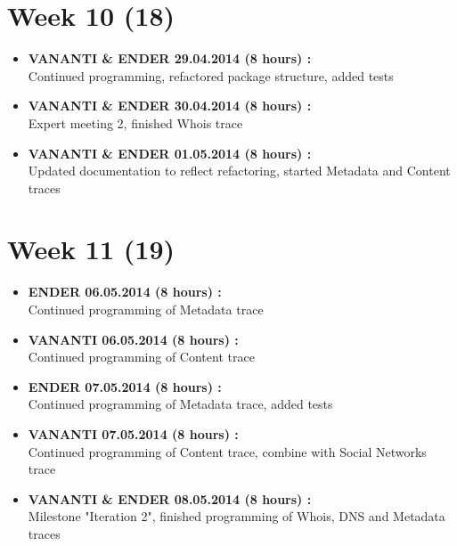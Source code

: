 \documentclass[
	a4paper,					10pt,							twoside,					openright,				notitlepage,			parskip=half,			]{scrreprt}
\begin{document}
\section*{Week 10 (18)}
\label{sec:worklog_10}
\begin{itemize}
\item{\textbf{VANANTI \& ENDER 29.04.2014 (8 hours) :} \\  Continued programming, refactored package structure, added tests}
\item{\textbf{VANANTI \& ENDER 30.04.2014 (8 hours) :} \\  Expert meeting 2, finished Whois trace}
\item{\textbf{VANANTI \& ENDER 01.05.2014 (8 hours) :} \\  Updated documentation to reflect refactoring, started Metadata and Content traces}
\end{itemize}
\section*{Week 11 (19)}
\label{sec:worklog_11}
\begin{itemize}
\item{\textbf{ENDER 06.05.2014 (8 hours) :} \\  Continued programming of Metadata trace}
\item{\textbf{VANANTI 06.05.2014 (8 hours) :} \\  Continued programming of Content trace}
\item{\textbf{ENDER 07.05.2014 (8 hours) :} \\  Continued programming of Metadata trace, added tests}
\item{\textbf{VANANTI 07.05.2014 (8 hours) :} \\  Continued programming of Content trace, combine with Social Networks trace}
\item{\textbf{VANANTI \& ENDER 08.05.2014 (8 hours) :} \\  Milestone "Iteration 2", finished programming of Whois, DNS and Metadata traces}
\end{itemize}
\end{document}
